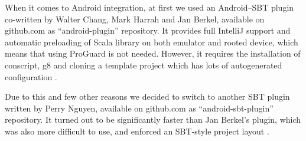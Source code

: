 When it comes to Android integration, at first we used an Android--SBT plugin co-written by Walter Chang, Mark Harrah and Jan Berkel, available on github.com as ``android-plugin'' repository. It provides full IntelliJ support and automatic preloading of Scala library on both emulator and rooted device, which means that using ProGuard is not needed. However, it requires the installation of conscript, g8 and cloning a template project which has lots of autogenerated configuration \cite{Nguyen:2013:differences}.

Due to this and few other reasons we decided to switch to another SBT plugin written by Perry Nguyen, available on github.com as ``android-sbt-plugin'' repository. It turned out to be significantly faster than Jan Berkel's plugin, which was also more difficult to use, and enforced an SBT-style project layout \cite{Nguyen:2013:differences}.




